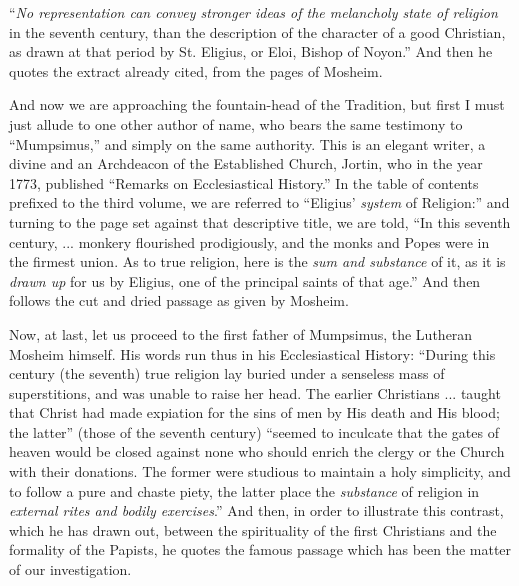 ``\emph{No representation can convey stronger ideas
of the melancholy state of religion} in the seventh
century, than the description of the character of a good
Christian, as drawn at that period by St. Eligius, or
Eloi, Bishop of Noyon.'' And then he quotes the
extract already cited, from the pages of Mosheim.

And now we are approaching the fountain-head of the
Tradition, but first I must just allude to one other
author of name, who bears the same testimony to
``Mumpsimus,'' and simply on the same authority. This is an elegant writer, a divine and an Archdeacon of
the Established Church, Jortin, who in the year 1773,
published ``Remarks on Ecclesiastical History.''
In the table of contents prefixed to the third volume, we
are referred to ``Eligius' \emph{system} of
Religion:'' and turning to the page set against that
descriptive title, we are told, ``In this seventh
century, ... monkery flourished prodigiously, and the
monks and Popes were in the firmest union. As to true
religion, here is the \emph{sum and substance} of it,
as it is \emph{drawn up} for us by Eligius, one of the
principal saints of that age.'' And then follows the
cut and dried passage as given by Mosheim.

Now, at last, let us proceed to the first father of
Mumpsimus, the Lutheran Mosheim himself. His words run
thus in his Ecclesiastical History: ``During this
century (the seventh) true religion lay buried under a
senseless mass of superstitions, and was unable to raise
her head. The earlier Christians ... taught that Christ
had made expiation for the sins of men by His death and
His blood; the latter'' (those of the seventh
century) ``seemed to inculcate that the gates of
heaven would be closed against none who should enrich the
clergy or the Church with their donations. The former
were studious to maintain a holy simplicity, and to
follow a pure and chaste piety, the latter place the \emph{substance}
of religion in \emph{external rites and bodily exercises}.''
And then, in order to illustrate this contrast, which he
has drawn out, between the spirituality of the first
Christians and the formality of the Papists, he quotes
the famous passage which has been the matter of our
investigation.


